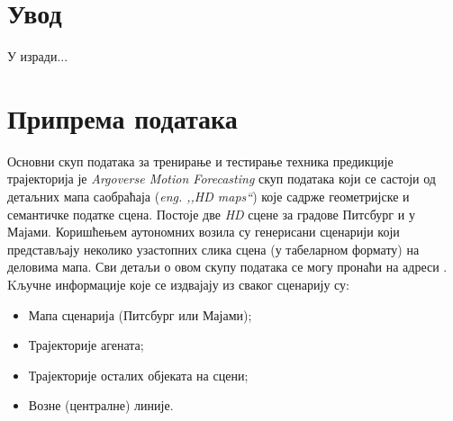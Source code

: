 \documentclass[11pt,oneside]{memoir}
\begin{document}
\frontmatter
\naslovna
\komisija
\apstrakt
\tableofcontents*

\mainmatter

\chapter{Увод}

У изради...

\chapter{Припрема података}

Основни скуп података за тренирање и тестирање техника предикције трајекторија је \textit{Argoverse Motion Forecasting} скуп података
који се састоји од детаљних мапа саобраћаја (\textit{eng. ,,HD maps``}) које садрже геометријске и семантичке податке сцена. Постоје две \textit{HD} сцене
за градове Питсбург и у Мајами. Коришћењем аутономних возила су генерисани сценарији који представљају неколико узастопних слика сцена (у табеларном формату)
на деловима мапа. Сви детаљи о овом скупу података се могу пронаћи на адреси 
\href{https://www.argoverse.org/index.html}{\color{blue}{www.argoverse.org}} \cite{argoverse}. \\


\noindent Kључне информације које се издвајају из сваког сценарију су:
\begin{itemize}
  \item Мапа сценарија (Питсбург или Мајами);
  \item Трајекторије агената;
  \item Трајекторије осталих објеката на сцени;
  \item Возне (централне) линије.
\end{itemize}
\end{document}
